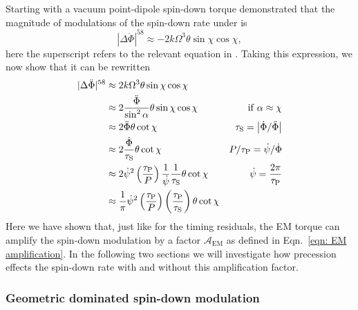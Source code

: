 \documentclass[../full_thesis/full_thesis.tex]{subfiles}
\begin{document}
Starting with a vacuum point-dipole spin-down torque \citet{Jones2001}
demonstrated that the magnitude of modulations of the spin-down rate under is
\begin{equation}
    |\Delta\ddot{\Phi}|^{58} \approx -2k\Omega^{3} \theta \sin\chi \cos\chi,
\end{equation}
here the superscript refers to the relevant equation in \citet{Jones2001}. Taking
this expression, we now show that it can be rewritten
\begin{align}
    |\Delta\ddot{\Phi}|^{58}
    & \approx 2k\Omega^{3} \theta \sin\chi \cos\chi & \\
    & \approx 2 \frac{\ddot{\Phi}}{\sin^{2}\alpha} \theta \sin\chi\cos\chi &
    \mathrm{if }\; \alpha \approx \chi \\
    & \approx 2 \ddot{\Phi}\theta \cot\chi &
    \tau_{\mathrm{S}} = \left| \dot{\Phi} / \ddot{\Phi}\right| \\
    & \approx 2 \frac{\dot{\Phi}}{\tau_{\mathrm{S}}} \theta \cot\chi &
    P/\tau_{\mathrm{P}} = \dot{\psi}/\dot{\Phi} \\
    & \approx 2 \dot{\psi}^{2}\left(\frac{\tau_{\mathrm{P}}}{P}\right) \frac{1}{\dot{\psi}} \frac{1}{\tau_{\mathrm{S}}} \theta \cot \chi & \dot{\psi} = \frac{2\pi}{\tau_{\mathrm{P}}} \\
    & \approx \frac{1}{\pi}\dot{\psi}^{2}\left(\frac{\tau_{\mathrm{P}}}{P}\right)\left(\frac{\tau_{\mathrm{P}}}{\tau_{\mathrm{S}}}\right) \theta \cot\chi
    \label{eqn: spin-down variations FP EM}
\end{align}
Here we have shown that, just like for the timing residuals, the EM torque can
amplify the spin-down modulation by a factor $\mathcal{A}_{\mathrm{EM}}$ as
defined in Eqn.~\eqref{eqn: EM amplification}. In the following two sections
we will investigate how precession effects the spin-down rate with and without
this amplification factor.

\subsubsection{Geometric dominated spin-down modulation}
\end{document}
